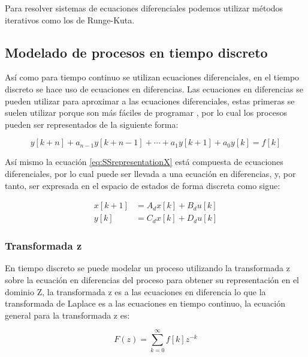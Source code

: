            Para resolver sistemas de ecuaciones diferenciales podemos utilizar métodos iterativos como los de Runge-Kuta.

    \subsection{Modelado de procesos en tiempo discreto}

        Así como para tiempo continuo se utilizan ecuaciones diferenciales, en el tiempo discreto se hace uso de ecuaciones en diferencias. Las ecuaciones en diferencias se pueden utilizar para aproximar a las ecuaciones diferenciales, estas primeras se suelen utilizar porque son más fáciles de programar \Parencite{kuo1996sistemas}, por lo cual los procesos pueden ser representados de la siguiente forma:
        
        \begin{equation}\label{eq:EqEnDiferencias}
            y[k+n] + a_{n-1}y[k+n-1] + \cdots + a_1 y[k+1] + a_0 y[k] = f[k] 
        \end{equation}
        
        Así mismo la ecuación \cref{eq:SSrepresentationX} está compuesta de ecuaciones diferenciales, por lo cual puede ser llevada a una ecuación en diferencias, y, por tanto, ser expresada en el espacio de estados de forma discreta como sigue:

        \begin{align}\label{eq:SSdiscreto}
            x[k+1] &= A_d x[k] + B_d u[k] \\
            y[k] &= C_d x[k] + D_d u[k]
        \end{align}

        \subsubsection{Transformada z}
		
			En tiempo discreto se puede modelar un proceso utilizando la transformada z sobre la ecuación en diferencias del proceso para obtener su representación en el dominio Z, la transformada z es a las ecuaciones en diferencia lo que la transformada de Laplace es a las ecuaciones en tiempo continuo, la ecuación general para la transformada z es:
			
			\begin{equation}\label{eq:Ztransform}
				F(z)= \sum\limits_{k=0}^{\infty}f[k]z^{-k}
			\end{equation}


